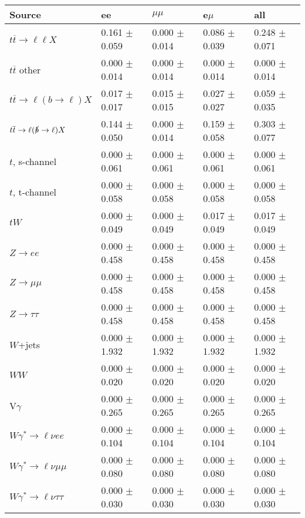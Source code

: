 \begin{tabular}{l | l l l l}
\hline\hline
 Source  &  ee  &  $\mu\mu$  &  e$\mu$  &  all \\
\hline
$t\overline{t}\rightarrow \ell\ell X$ &  0.161 $\pm$  0.059 &  0.000 $\pm$  0.014 &  0.086 $\pm$  0.039 &  0.248 $\pm$  0.071\\
$t\overline{t}$ other &  0.000 $\pm$  0.014 &  0.000 $\pm$  0.014 &  0.000 $\pm$  0.014 &  0.000 $\pm$  0.014\\
$t\overline{t}\rightarrow \ell(b\rightarrow \ell)X$ &  0.017 $\pm$  0.017 &  0.015 $\pm$  0.015 &  0.027 $\pm$  0.027 &  0.059 $\pm$  0.035\\
$t\overline{t}\rightarrow \ell(\slashed{b}\rightarrow \ell)X$ &  0.144 $\pm$  0.050 &  0.000 $\pm$  0.014 &  0.159 $\pm$  0.058 &  0.303 $\pm$  0.077\\
\hline
$t$, s-channel &  0.000 $\pm$  0.061 &  0.000 $\pm$  0.061 &  0.000 $\pm$  0.061 &  0.000 $\pm$  0.061\\
$t$, t-channel &  0.000 $\pm$  0.058 &  0.000 $\pm$  0.058 &  0.000 $\pm$  0.058 &  0.000 $\pm$  0.058\\
$tW$ &  0.000 $\pm$  0.049 &  0.000 $\pm$  0.049 &  0.017 $\pm$  0.049 &  0.017 $\pm$  0.049\\
\hline
$Z\rightarrow ee$ &  0.000 $\pm$  0.458 &  0.000 $\pm$  0.458 &  0.000 $\pm$  0.458 &  0.000 $\pm$  0.458\\
$Z\rightarrow\mu\mu$ &  0.000 $\pm$  0.458 &  0.000 $\pm$  0.458 &  0.000 $\pm$  0.458 &  0.000 $\pm$  0.458\\
$Z\rightarrow\tau\tau$ &  0.000 $\pm$  0.458 &  0.000 $\pm$  0.458 &  0.000 $\pm$  0.458 &  0.000 $\pm$  0.458\\
$W$+jets &  0.000 $\pm$  1.932 &  0.000 $\pm$  1.932 &  0.000 $\pm$  1.932 &  0.000 $\pm$  1.932\\
$WW$ &  0.000 $\pm$  0.020 &  0.000 $\pm$  0.020 &  0.000 $\pm$  0.020 &  0.000 $\pm$  0.020\\
\hline
V$\gamma$ &  0.000 $\pm$  0.265 &  0.000 $\pm$  0.265 &  0.000 $\pm$  0.265 &  0.000 $\pm$  0.265\\
$W\gamma^{*}\rightarrow\ell\nu e e$ &  0.000 $\pm$  0.104 &  0.000 $\pm$  0.104 &  0.000 $\pm$  0.104 &  0.000 $\pm$  0.104\\
$W\gamma^{*}\rightarrow\ell\nu\mu\mu$ &  0.000 $\pm$  0.080 &  0.000 $\pm$  0.080 &  0.000 $\pm$  0.080 &  0.000 $\pm$  0.080\\
$W\gamma^{*}\rightarrow\ell\nu\tau\tau$ &  0.000 $\pm$  0.030 &  0.000 $\pm$  0.030 &  0.000 $\pm$  0.030 &  0.000 $\pm$  0.030\\

\end{tabular}

